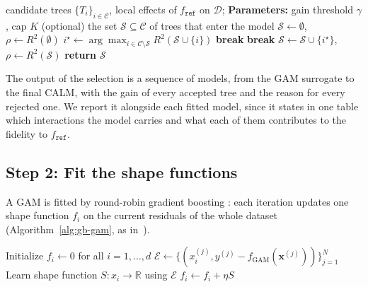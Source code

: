 \begin{algorithm}[tb]
\caption{Selecting the trees to keep}
\label{alg:select-trees}
\begin{algorithmic}[1]
    candidate trees $\{T_i\}_{i \in \mathcal{C}}$, local effects of $f_{\texttt{ref}}$ on $\mathcal{D}$; {\bfseries Parameters:} gain threshold $\gamma$, cap $K$ (optional)
    the set $\mathcal{S} \subseteq \mathcal{C}$ of trees that enter the model
   \STATE $\mathcal{S} \leftarrow \emptyset$, $\rho \leftarrow R^2(\emptyset)$ 
      \STATE $i^\star \leftarrow \arg\max_{i \in \mathcal{C} \setminus \mathcal{S}} R^2(\mathcal{S} \cup \{i\})$ 
         \STATE \textbf{break} 
      \ENDIF
         \STATE \textbf{break} 
      \ENDIF
      \STATE $\mathcal{S} \leftarrow \mathcal{S} \cup \{i^\star\}$, $\rho \leftarrow R^2(\mathcal{S})$
   \ENDWHILE
   \STATE \textbf{return} $\mathcal{S}$
\end{algorithmic}
\end{algorithm}

The output of the selection is a sequence of models, from the GAM surrogate to the final CALM, with the gain of every accepted tree and the reason for every rejected one.
We report it alongside each fitted model, since it states in one table which interactions the model carries and what each of them contributes to the fidelity to $f_{\texttt{ref}}$.

\subsection{Step 2: Fit the shape functions}

A GAM is fitted by round-robin gradient boosting \cite{friedman2001greedy}: each iteration updates one shape function \(f_i\) on the current residuals of the whole dataset (Algorithm~\ref{alg:gb-gam}, as in~\cite{lou2012intelligible}).

\begin{algorithm}[tb]
\caption{Gradient Boosting for GAM}
\label{alg:gb-gam}
\begin{algorithmic}[1]
   \STATE Initialize $f_i \leftarrow 0$ for all $i = 1, \dots, d$
         \STATE $\mathcal{E} \leftarrow \{(x^{(j)}_i, y^{(j)} - f_{\text{GAM}}(\mathbf{x}^{(j)}))\}_{j=1}^N$ 
         \STATE Learn shape function $S : x_i \rightarrow \mathbb{R}$ using $\mathcal{E}$ 
         \STATE $f_i \leftarrow f_i + \eta S$ 
      \ENDFOR
   \ENDFOR
\end{algorithmic}
\end{algorithm}

